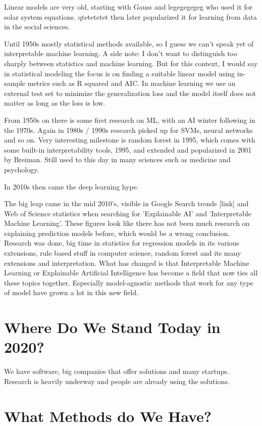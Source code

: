 \documentclass[runningheads]{llncs}
\begin{document}
Linear models are very old, starting with Gauss and legegegegeg who used it for solar system equations.
qtetetetet then later popularized it for learning from data in the social sciences.

Until 1950s mostly statistical methods available, so I guess we can't speak yet of interpretable machine learning.
A side note: I don't want to distinguish too sharply between statistics and machine learning.
But for this context, I would say in statistical modeling the focus is on finding a suitable linear model using in-sample metrics such as R squared and AIC.
In machine learning we use an external test set to minimize the generalization loss and the model itself does not matter as long as the loss is low.

From 1950s on there is some first research on ML, with an AI winter following in the 1970s.
Again in 1980s / 1990s research picked up for SVMs, neural networks and so on.
Very interesting milestone is random forest in 1995, which comes with some built-in interpretability tools, 1995, and extended and popularized in 2001 by Breiman.
Still used to this day in many sciences such as medicine and psychology.

In 2010s then came the deep learning hype.

The big leap came in the mid 2010's, visible in Google Search trends [link] and Web of Science statistics when searching for 'Explainable AI' and 'Interpretable Machine Learning'.
These figures look like there has not been much research on explaining prediction models before, which would be a wrong conclusion.
Research was done, big time in statistics for regression models in its various extensions, rule based stuff in computer science, random forest and its many extensions and interpretation.
What has changed is that Interpretable Machine Learning or Explainable Artificial Intelligence has become a field that now ties all these topics together.
Especially model-agnostic methods that work for any type of model have grown a lot in this new field.

\section{Where Do We Stand Today in 2020?}

We have software, big companies that offer solutions and many startups.
Research is heavily underway and people are already using the solutions.

\section{What Methods do We Have?}
\end{document}

